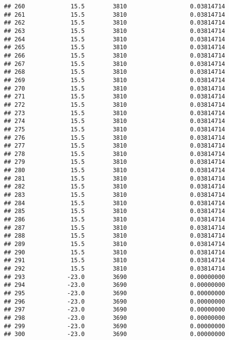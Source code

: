 \documentclass[]{article}
\begin{document}
\begin{verbatim}
## 260             15.5        3810                  0.03814714
## 261             15.5        3810                  0.03814714
## 262             15.5        3810                  0.03814714
## 263             15.5        3810                  0.03814714
## 264             15.5        3810                  0.03814714
## 265             15.5        3810                  0.03814714
## 266             15.5        3810                  0.03814714
## 267             15.5        3810                  0.03814714
## 268             15.5        3810                  0.03814714
## 269             15.5        3810                  0.03814714
## 270             15.5        3810                  0.03814714
## 271             15.5        3810                  0.03814714
## 272             15.5        3810                  0.03814714
## 273             15.5        3810                  0.03814714
## 274             15.5        3810                  0.03814714
## 275             15.5        3810                  0.03814714
## 276             15.5        3810                  0.03814714
## 277             15.5        3810                  0.03814714
## 278             15.5        3810                  0.03814714
## 279             15.5        3810                  0.03814714
## 280             15.5        3810                  0.03814714
## 281             15.5        3810                  0.03814714
## 282             15.5        3810                  0.03814714
## 283             15.5        3810                  0.03814714
## 284             15.5        3810                  0.03814714
## 285             15.5        3810                  0.03814714
## 286             15.5        3810                  0.03814714
## 287             15.5        3810                  0.03814714
## 288             15.5        3810                  0.03814714
## 289             15.5        3810                  0.03814714
## 290             15.5        3810                  0.03814714
## 291             15.5        3810                  0.03814714
## 292             15.5        3810                  0.03814714
## 293            -23.0        3690                  0.00000000
## 294            -23.0        3690                  0.00000000
## 295            -23.0        3690                  0.00000000
## 296            -23.0        3690                  0.00000000
## 297            -23.0        3690                  0.00000000
## 298            -23.0        3690                  0.00000000
## 299            -23.0        3690                  0.00000000
## 300            -23.0        3690                  0.00000000

\end{verbatim}
\end{document}
